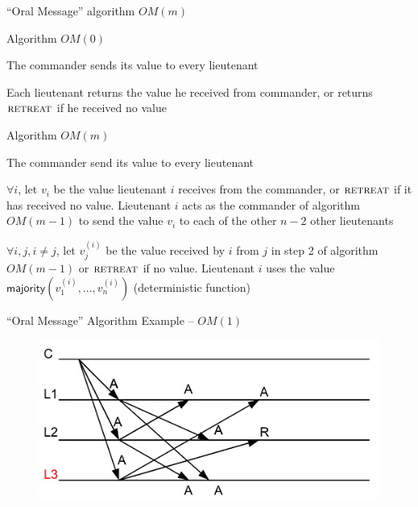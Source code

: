 \begin{frame}{“Oral Message” algorithm $OM(m)$}

\BIL
\item Algorithm $OM(0)$
	\BE
	\item The commander sends its value to every lieutenant
	\item Each lieutenant returns the value he received from commander, or returns $\textsc{retreat}$ if he received no value
	\EE
\item Algorithm $OM(m)$
	\BE
	\item The commander send its value to every lieutenant
	\item $\forall i$, let $v_i$ be the value lieutenant $i$ receives from the
	commander, or $\textsc{retreat}$ if it has received no value. Lieutenant $i$ acts as the
	commander of algorithm $OM(m-1)$ to send the value $v_i$ to each of the other $n-2$
	other lieutenants
	\item $\forall i,j, i \neq j$, let $v_j^{(i)}$ be the value received by $i$ from $j$
	in step 2 of algorithm $OM(m-1)$ or $\textsc{retreat}$ if no value. Lieutenant $i$ uses
	the value $\mathsf{majority}(v_1^{(i)}, ..., v_n^{(i)})$ (deterministic function)
	\EE
\EIL
\end{frame}

\begin{frame}{“Oral Message” Algorithm Example -- $OM(1)$}
	
\begin{figure}	
	\includegraphics[width=\textwidth]{figs/16/oral}
\end{figure}
	
\end{frame}



